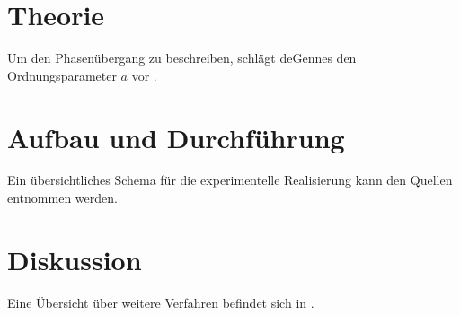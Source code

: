 \documentclass{scrartcl}
\begin{document}
\section{Theorie}

Um den Phasenübergang zu beschreiben, schlägt deGennes den Ordnungsparameter $a$ vor \cite[2--8]{deGennes}.

\section{Aufbau und Durchführung}

Ein übersichtliches Schema für die experimentelle Realisierung kann den Quellen \cite{martin, magnet} entnommen werden.

\section{Diskussion}

Eine Übersicht über weitere Verfahren befindet sich in \cite{kent}.

\printbibliography
\end{document}
